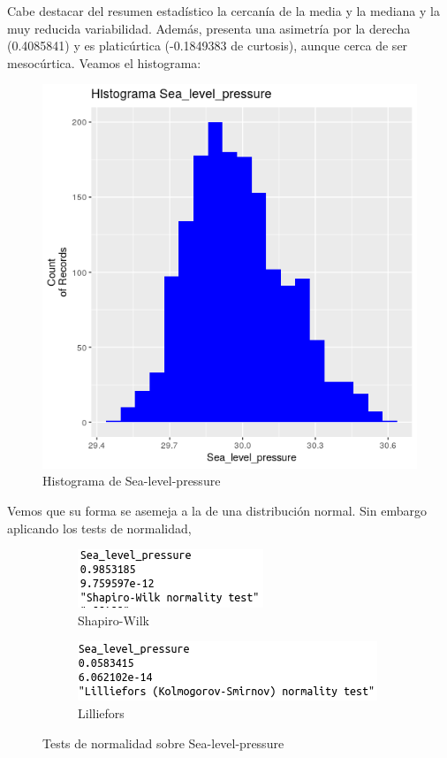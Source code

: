 Cabe destacar del resumen estadístico la cercanía de la media y la mediana y la muy reducida variabilidad. Además, presenta una asimetría por la derecha (0.4085841) y es platicúrtica (-0.1849383 de curtosis), aunque cerca de ser mesocúrtica. Veamos el histograma:

\begin{figure}[H] %
	\centering
	\includegraphics[scale=0.7]{hist-slp.png}  %
	\caption{Histograma de Sea-level-pressure} 
	\label{fig:hist-slp}
\end{figure}

Vemos que su forma se asemeja a la de una distribución normal. Sin embargo aplicando los tests de normalidad,
\begin{figure}[H]
	\centering
	\begin{subfigure}{.5\textwidth}
		\centering
		\includegraphics[width=.7\linewidth]{shapiro-slp.png}
		\caption{Shapiro-Wilk}
		\label{fig:sw-slp}
	\end{subfigure}%
	\begin{subfigure}{.5\textwidth}
		\centering
		\includegraphics[width=.7\linewidth]{lillie-slp.png}	\caption{Lilliefors}
		\label{fig:l-slp}
	\end{subfigure}
	\caption{Tests de normalidad sobre Sea-level-pressure}
	\label{fig:norm-slp}
\end{figure}

